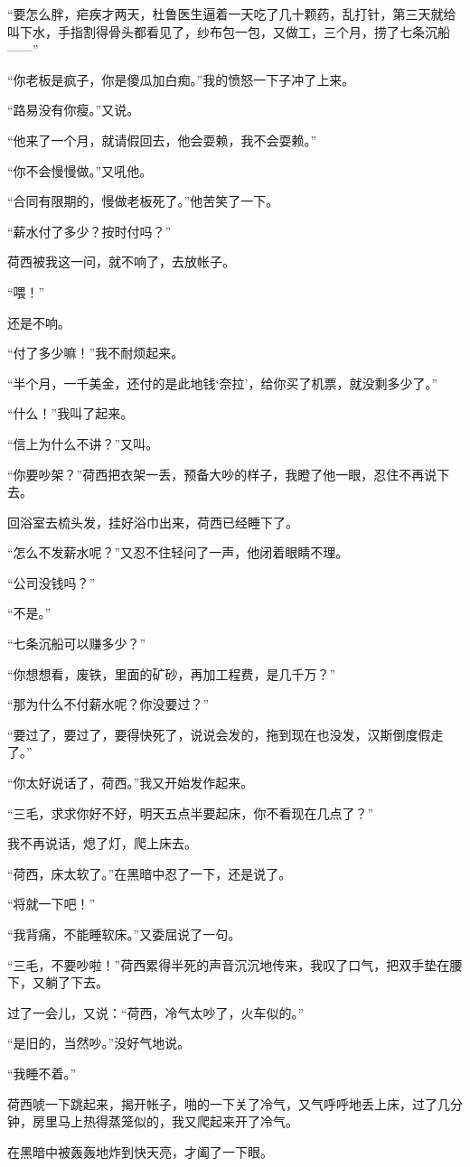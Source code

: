 \par “要怎么胖，疟疾才两天，杜鲁医生逼着一天吃了几十颗药，乱打针，第三天就给叫下水，手指割得骨头都看见了，纱布包一包，又做工，三个月，捞了七条沉船——”
\par “你老板是疯子，你是傻瓜加白痴。”我的愤怒一下子冲了上来。
\par “路易没有你瘦。”又说。
\par “他来了一个月，就请假回去，他会耍赖，我不会耍赖。”
\par “你不会慢慢做。”又吼他。
\par “合同有限期的，慢做老板死了。”他苦笑了一下。
\par “薪水付了多少？按时付吗？”
\par 荷西被我这一问，就不响了，去放帐子。
\par “喂！”
\par 还是不响。
\par “付了多少嘛！”我不耐烦起来。
\par “半个月，一千美金，还付的是此地钱‘奈拉’，给你买了机票，就没剩多少了。”
\par “什么！”我叫了起来。
\par “信上为什么不讲？”又叫。
\par “你要吵架？”荷西把衣架一丢，预备大吵的样子，我瞪了他一眼，忍住不再说下去。
\par 回浴室去梳头发，挂好浴巾出来，荷西已经睡下了。
\par “怎么不发薪水呢？”又忍不住轻问了一声，他闭着眼睛不理。
\par “公司没钱吗？”
\par “不是。”
\par “七条沉船可以赚多少？”
\par “你想想看，废铁，里面的矿砂，再加工程费，是几千万？”
\par “那为什么不付薪水呢？你没要过？”
\par “要过了，要过了，要得快死了，说说会发的，拖到现在也没发，汉斯倒度假走了。”
\par “你太好说话了，荷西。”我又开始发作起来。
\par “三毛，求求你好不好，明天五点半要起床，你不看现在几点了？”
\par 我不再说话，熄了灯，爬上床去。
\par “荷西，床太软了。”在黑暗中忍了一下，还是说了。
\par “将就一下吧！”
\par “我背痛，不能睡软床。”又委屈说了一句。
\par “三毛，不要吵啦！”荷西累得半死的声音沉沉地传来，我叹了口气，把双手垫在腰下，又躺了下去。
\par 过了一会儿，又说：“荷西，冷气太吵了，火车似的。”
\par “是旧的，当然吵。”没好气地说。
\par “我睡不着。”
\par 荷西唬一下跳起来，揭开帐子，啪的一下关了冷气，又气呼呼地丢上床，过了几分钟，房里马上热得蒸笼似的，我又爬起来开了冷气。
\par 在黑暗中被轰轰地炸到快天亮，才阖了一下眼。






